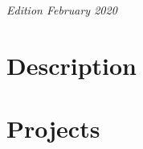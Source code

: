 \documentclass[11pt,fleqn]{book} %
\begin{document}
\noindent \textit{Edition February 2020 } %



\pagestyle{empty} %

\tableofcontents %

\cleardoublepage %

\pagestyle{fancy} %





\part{Description}







\part{Projects}


\end{document}
